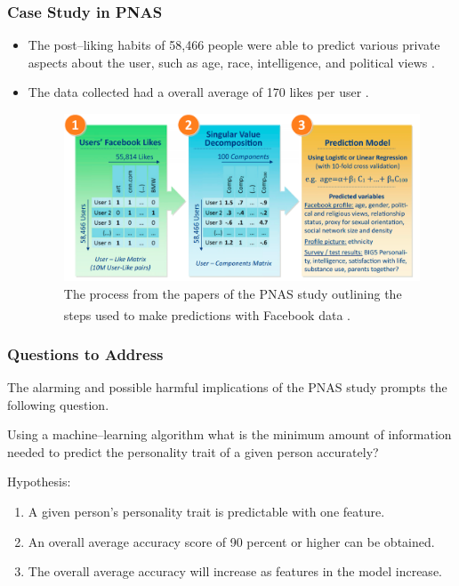 \documentclass{beamer}
\begin{document}
\begin{frame}
\frametitle{Case Study in PNAS}
\footnotesize
\begin{itemize}
    \item The post--liking habits of 58,466 people were able to predict various private aspects about the user, such as age, race, intelligence, and political views \cite{Kosinski2013}.
    \item The data collected had a overall average of  170 likes per user \cite{Kosinski2013}.
    \begin{figure}[ht]
\centering
\includegraphics[scale=0.15]{PNAS}
\caption{ \footnotesize The process from the papers of the PNAS study outlining the steps used to make predictions with Facebook\textsuperscript{\textregistered} data \cite{Kosinski2013}.}
\end{figure}

\end{itemize}
\end{frame}

\begin{frame}
\frametitle{Questions to Address}
\footnotesize
The alarming and possible harmful implications of the PNAS study prompts the following question.

\begin{q1}
Using a machine--learning algorithm what is the minimum amount of information needed to predict the personality trait of a given person accurately?
\end{q1}
Hypothesis:
\begin{enumerate}

\item A given person's personality trait is predictable with one feature.
\item An overall average accuracy score of 90 percent or higher can be obtained.
\item The overall average accuracy will increase as features in the model increase.
\end{enumerate}
\end{frame}
\end{document}
